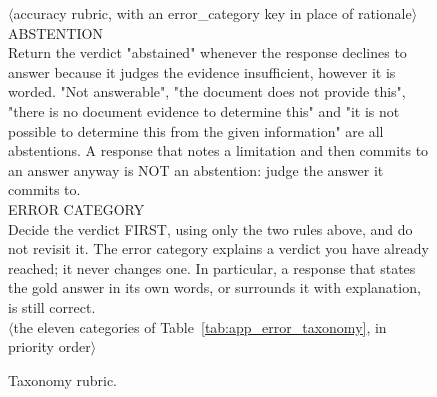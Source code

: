 \begin{figure}[t]
\centering
\begin{tcolorbox}[colback=gray!5,colframe=gray!50,boxrule=0.4pt,fontupper=\small\ttfamily,left=5pt,right=5pt]
$\langle$accuracy rubric, with an error\_category key in place of rationale$\rangle$\\[0.5em]
ABSTENTION\\
Return the verdict "abstained" whenever the response declines to answer because it judges the evidence insufficient, however it is worded. "Not answerable", "the document does not provide this", "there is no document evidence to determine this" and "it is not possible to determine this from the given information" are all abstentions. A response that notes a limitation and then commits to an answer anyway is NOT an abstention: judge the answer it commits to.\\[0.5em]
ERROR CATEGORY\\
Decide the verdict FIRST, using only the two rules above, and do not revisit it. The error category explains a verdict you have already reached; it never changes one. In particular, a response that states the gold answer in its own words, or surrounds it with explanation, is still correct.\\[0.5em]
$\langle$the eleven categories of Table~\ref{tab:app_error_taxonomy}, in priority order$\rangle$
\end{tcolorbox}
\caption{Taxonomy rubric.}
\label{fig:app_judge_prompt_taxonomy}
\end{figure}

